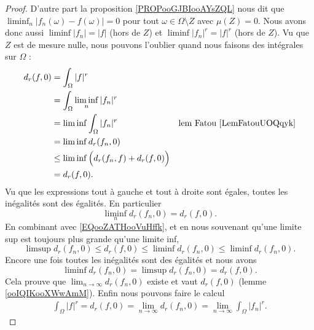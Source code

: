 \begin{proof}
	D'autre part la proposition \ref{PROPooGJBIooAYsZQL} nous dit que \( \liminf_n|f_n(\omega)-f(\omega)|=0\) pour tout \(\omega\in \Omega\setminus Z\) avec \( \mu(Z)=0\). Nous avons donc aussi \( \liminf| f_n |=| f |\) (hors de \( Z\)) et \( \liminf| f_n |^r=| f |^r\) (hors de \( Z\)). Vu que \( Z\) est de mesure nulle, nous pouvons l'oublier quand nous faisons des intégrales sur \( \Omega\) :
	\begin{subequations}
		\begin{align}
			d_r(f,0) & =\int_{\Omega}| f |^r                                                               \\
			         & =\int_{\Omega}\liminf_n| f_n |^r                                                    \\
			         & =\liminf\int_{\Omega}| f_n |^r              & \text{lem Fatou \ref{LemFatouUOQqyk}} \\
			         & = \liminf d_r(f_n,0)                                                                \\
			         & \leq \liminf\Big( d_r(f_n,f)+d_r(f,0) \Big)                                         \\
			         & =d_r(f,0).
		\end{align}
	\end{subequations}
	Vu que les expressions tout à gauche et tout à droite sont égales, toutes les inégalités sont des égalités. En particulier
	\begin{equation}
		\liminf_n d_r(f_n,0)=d_r(f,0).
	\end{equation}
	En combinant avec \eqref{EQooZATHooVuHffk}, et en nous souvenant qu'une limite sup est toujours plus grande qu'une limite inf,
	\begin{equation}
		\limsup d_r(f_n,0)\leq d_r(f,0)\leq \liminf d_r(f_n,0)\leq \liminf d_r(f_n,0).
	\end{equation}
	Encore une fois toutes les inégalités sont des égalités et nous avons
	\begin{equation}
		\liminf d_r(f_n,0)=\limsup d_r(f_n,0)=d_r(f,0).
	\end{equation}
	Cela prouve que \( \lim_{n\to \infty}d_r(f_n,0)\) existe et vaut \( d_r(f,0)\) (lemme \ref{ooIQIKooXWwAmM}). Enfin nous pouvons faire le calcul
	\begin{subequations}
		\begin{align}
			\int_{\Omega}| f |^r=d_r(f,0)=\lim_{n\to \infty}d_r(f_n,0)=\lim_{n\to\infty}\int_{\Omega}| f_n |^r.
		\end{align}
	\end{subequations}
\end{proof}


